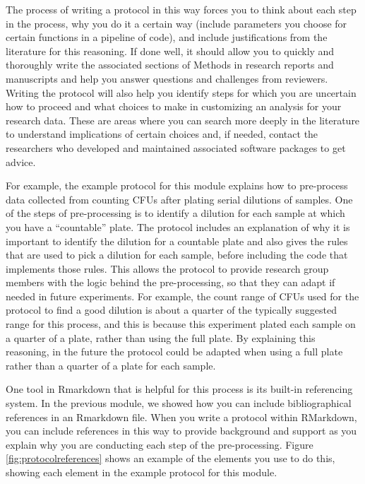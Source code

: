 \documentclass[]{tufte-book}
\begin{document}
The process of writing a protocol in this way forces you to think about each
step in the process, why you do it a certain way (include parameters you choose
for certain functions in a pipeline of code), and include justifications from
the literature for this reasoning. If done well, it should allow you to quickly
and thoroughly write the associated sections of Methods in research reports and
manuscripts and help you answer questions and challenges from reviewers. Writing
the protocol will also help you identify steps for which you are uncertain how
to proceed and what choices to make in customizing an analysis for your research
data. These are areas where you can search more deeply in the literature to
understand implications of certain choices and, if needed, contact the
researchers who developed and maintained associated software packages to get
advice.

For example, the example protocol for this module explains how to pre-process
data collected from counting CFUs after plating serial dilutions of samples. One
of the steps of pre-processing is to identify a dilution for each sample at
which you have a ``countable'' plate. The protocol includes an explanation of why
it is important to identify the dilution for a countable plate and also gives
the rules that are used to pick a dilution for each sample, before including the
code that implements those rules. This allows the protocol to provide research
group members with the logic behind the pre-processing, so that they can adapt
if needed in future experiments. For example, the count range of CFUs used for
the protocol to find a good dilution is about a quarter of the typically
suggested range for this process, and this is because this experiment plated
each sample on a quarter of a plate, rather than using the full plate. By
explaining this reasoning, in the future the protocol could be adapted when
using a full plate rather than a quarter of a plate for each sample.

One tool in Rmarkdown that is helpful for this process is its built-in
referencing system. In the previous module, we showed how you can include
bibliographical references in an Rmarkdown file. When you write a protocol
within RMarkdown, you can include references in this way to provide background
and support as you explain why you are conducting each step of the
pre-processing. Figure \ref{fig:protocolreferences} shows an example of the
elements you use to do this, showing each element in the example protocol for
this module.
\end{document}
